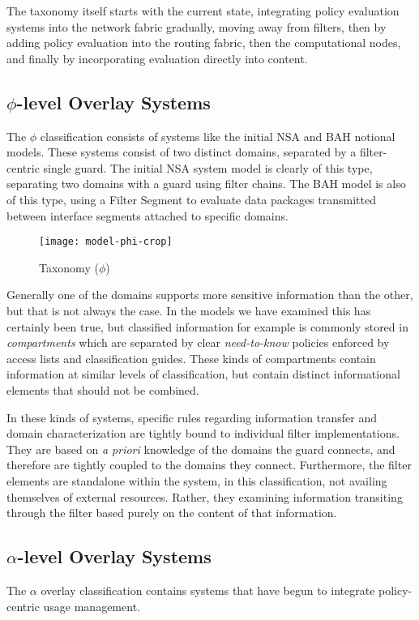 The taxonomy itself starts with the current state, integrating policy evaluation systems into the network fabric gradually, moving away from filters, then by adding policy evaluation into the routing fabric, then the computational nodes, and finally by incorporating evaluation directly into content.

\subsection{$\phi$-level Overlay Systems}
The $\phi$ classification consists of systems like the initial NSA and BAH notional models.  These systems consist of two distinct domains, separated by a filter-centric single guard.  The initial NSA system model is clearly of this type, separating two domains with a guard using filter chains.  The BAH model is also of this type, using a Filter Segment to evaluate data packages transmitted between interface segments attached to specific domains.

\begin{figure}[!t]
\centering
\texttt{[image: model-phi-crop]}
\caption{Taxonomy ($\phi$)}
\label{fig:model:taxonomy-phi}
\end{figure}

Generally one of the domains supports more sensitive information than the other, but that is not always the case.  In the models we have examined this has certainly been true, but classified information for example  is commonly stored in \textit{compartments} which are separated by clear \textit{need-to-know} policies enforced by access lists and classification guides.  These kinds of compartments contain information at similar levels of classification, but contain distinct informational elements that should not be combined.

In these kinds of systems, specific rules regarding information transfer and domain characterization are tightly bound to individual filter implementations.  They are based on \textit{a priori} knowledge of the domains the guard connects, and therefore are tightly coupled to the domains they connect.  Furthermore, the filter elements are standalone within the system, in this classification, not availing themselves of external resources.  Rather, they examining information transiting through the filter based purely on the content of that information.

\subsection{$\alpha$-level Overlay Systems}
The $\alpha$ overlay classification contains systems that have begun to integrate policy-centric usage management.


